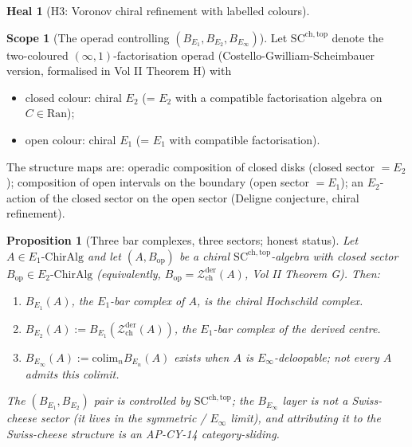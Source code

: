 \documentclass[11pt]{amsart}
\newtheorem{proposition}[theorem]{Proposition}
\theoremstyle{definition}
\newtheorem{heal}[attack]{Heal}
\newtheorem{scope}[theorem]{Scope}
\providecommand{\Eone}{E_1}
\providecommand{\Etwo}{E_2}
\providecommand{\Einf}{E_\infty}
\providecommand{\cZ}{\mathcal{Z}}
\providecommand{\Ran}{\mathrm{Ran}}
\begin{document}
\begin{heal}[H3: Voronov chiral refinement with labelled colours]\leavevmode

\begin{scope}[The operad controlling $(B_{\Eone}, B_{\Etwo}, B_{\Einf})$]\label{scope:swiss-cheese}
Let $\mathrm{SC}^{\mathrm{ch,top}}$ denote the two-coloured
$(\infty,1)$-factorisation operad (Costello-Gwilliam-Scheimbauer
version, formalised in Vol II Theorem H) with
\begin{itemize}
 \item closed colour: chiral $E_2$ (= $\Etwo$ with a compatible
   factorisation algebra on $C \in \Ran$);
 \item open colour: chiral $E_1$ (= $\Eone$ with compatible
   factorisation).
\end{itemize}
The structure maps are: operadic composition of closed disks
(closed sector $= \Etwo$); composition of open intervals on the
boundary (open sector $= \Eone$); an $\Etwo$-action of the closed
sector on the open sector (Deligne conjecture, chiral refinement).
\end{scope}

\begin{proposition}[Three bar complexes, three sectors; honest status]\label{prop:three-bar-sectors}
Let $A \in \Eone\text{-}\mathrm{ChirAlg}$ and let $(A, B_{\mathrm{op}})$
be a chiral $\mathrm{SC}^{\mathrm{ch,top}}$-algebra with closed sector
$B_{\mathrm{op}} \in \Etwo\text{-}\mathrm{ChirAlg}$ (equivalently,
$B_{\mathrm{op}} = \cZ^{\mathrm{der}}_{\mathrm{ch}}(A)$, Vol II
Theorem G). Then:
\begin{enumerate}[label=(\roman*)]
 \item $B_{\Eone}(A)$, the $\Eone$-bar complex of $A$, is the chiral
   Hochschild complex.
 \item $B_{\Etwo}(A) := B_{\Eone}(\cZ^{\mathrm{der}}_{\mathrm{ch}}(A))$,
   the $\Eone$-bar complex of the derived centre.
 \item $B_{\Einf}(A) := \mathrm{colim}_n B_{E_n}(A)$ exists when
   $A$ is $\Einf$-deloopable; not every $A$ admits this colimit.
\end{enumerate}
The $(B_{\Eone}, B_{\Etwo})$ pair is controlled by
$\mathrm{SC}^{\mathrm{ch,top}}$; the $B_{\Einf}$ layer is {\em not}
a Swiss-cheese sector (it lives in the symmetric / $\Einf$ limit),
and attributing it to the Swiss-cheese structure is an AP-CY-14
category-sliding.
\end{proposition}


\end{heal}
\end{document}
